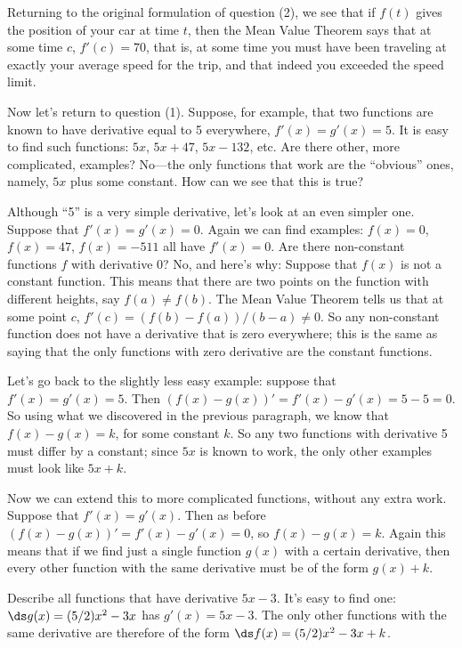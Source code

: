 \begin{theorem}
\begin{theorem}
Returning to the original formulation of question (2), we see that if
$f(t)$ gives the position of your car at time $t$, then the Mean Value
Theorem says that at some time $c$, $f'(c)=70$, that is, at some time
you must have been traveling at exactly your average speed for the
trip, and that indeed you exceeded the speed limit.

Now let's return to question (1). Suppose, for example, that two
functions are known to have derivative equal to 5 everywhere,
$f'(x)=g'(x)=5$. It is easy to find such functions: $5x$, $5x+47$,
$5x-132$, etc. Are there other, more complicated, examples? No---the
only functions that work are the ``obvious'' ones, namely, $5x$ plus
some constant. How can we see that this is true?

Although ``5'' is a very simple derivative, let's look at an even
simpler one. Suppose that $f'(x)=g'(x)=0$. Again we can find examples:
$f(x)=0$, $f(x)=47$, $f(x)=-511$ all have $f'(x)=0$. Are there
non-constant functions $f$ with derivative 0? No, and here's why:
Suppose that $f(x)$ is not a constant function. This means that there
are two points on the function with different heights, say
$f(a)\not=f(b)$. The Mean Value Theorem tells us that at some point
$c$, $f'(c)=(f(b)-f(a))/(b-a)\not=0$. So any non-constant function
does not have a derivative that is zero everywhere; this is the same
as saying that the only functions with zero derivative are the
constant functions.

Let's go back to the slightly less easy example: suppose that 
$f'(x)=g'(x)=5$. Then $(f(x)-g(x))' = f'(x)-g'(x) = 5 -5 =0$. So using
what we discovered in the previous paragraph, we know that
$f(x)-g(x)=k$, for some constant $k$. So any two functions with
derivative 5 must differ by a constant; since $5x$ is known to work,
the only other examples must look like $5x+k$.

Now we can extend this to more complicated functions, without any
extra work. Suppose that $f'(x)=g'(x)$. Then as before
$(f(x)-g(x))' = f'(x)-g'(x) =0$, so $f(x)-g(x)=k$. Again this means
that if we find just a single function $g(x)$ with a certain
derivative, then every other function with the same derivative must be
of the form $g(x)+k$.

\begin{example}
Describe all functions that have derivative $5x-3$. It's easy to find
one: $\ds g(x)=(5/2)x^2-3x$ has $g'(x)=5x-3$. The only other functions
with the same derivative are therefore of the form
$\ds f(x)=(5/2)x^2-3x+k$.


\end{example}
\end{theorem}
\end{theorem}

